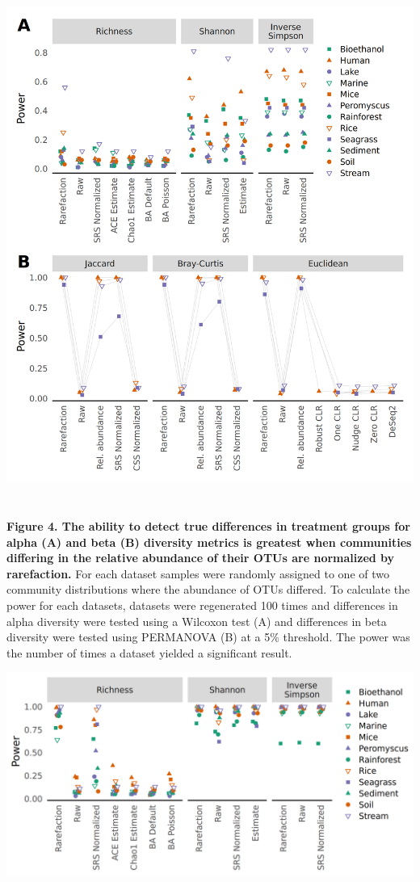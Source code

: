 \documentclass[
]{article}
\begin{document}
\includegraphics[height=17cm]{figure_4.png}

\textbf{Figure 4. The ability to detect true differences in treatment
groups for alpha (A) and beta (B) diversity metrics is greatest when
communities differing in the relative abundance of their OTUs are
normalized by rarefaction.} For each dataset samples were randomly
assigned to one of two community distributions where the abundance of
OTUs differed. To calculate the power for each datasets, datasets were
regenerated 100 times and differences in alpha diversity were tested
using a Wilcoxon test (A) and differences in beta diversity were tested
using PERMANOVA (B) at a 5\% threshold. The power was the number of
times a dataset yielded a significant result.

\newpage

\includegraphics{figure_5.png}
\end{document}
